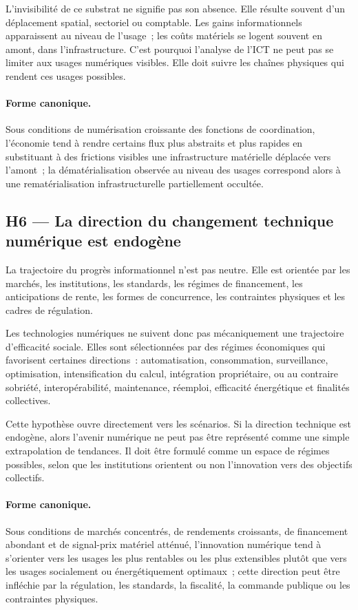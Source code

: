 L'invisibilité de ce substrat ne signifie pas son absence. Elle résulte souvent d'un déplacement spatial, sectoriel ou comptable. Les gains informationnels apparaissent au niveau de l'usage~; les coûts matériels se logent souvent en amont, dans l'infrastructure. C'est pourquoi l'analyse de l'ICT ne peut pas se limiter aux usages numériques visibles. Elle doit suivre les chaînes physiques qui rendent ces usages possibles.

\paragraph{Forme canonique.}
Sous conditions de numérisation croissante des fonctions de coordination, l'économie tend à rendre certains flux plus abstraits et plus rapides en substituant à des frictions visibles une infrastructure matérielle déplacée vers l'amont~; la dématérialisation observée au niveau des usages correspond alors à une rematérialisation infrastructurelle partiellement occultée.

\subsection{H6 --- La direction du changement technique numérique est endogène}

La trajectoire du progrès informationnel n'est pas neutre. Elle est orientée par les marchés, les institutions, les standards, les régimes de financement, les anticipations de rente, les formes de concurrence, les contraintes physiques et les cadres de régulation.

Les technologies numériques ne suivent donc pas mécaniquement une trajectoire d'efficacité sociale. Elles sont sélectionnées par des régimes économiques qui favorisent certaines directions~: automatisation, consommation, surveillance, optimisation, intensification du calcul, intégration propriétaire, ou au contraire sobriété, interopérabilité, maintenance, réemploi, efficacité énergétique et finalités collectives.

Cette hypothèse ouvre directement vers les scénarios. Si la direction technique est endogène, alors l'avenir numérique ne peut pas être représenté comme une simple extrapolation de tendances. Il doit être formulé comme un espace de régimes possibles, selon que les institutions orientent ou non l'innovation vers des objectifs collectifs.

\paragraph{Forme canonique.}
Sous conditions de marchés concentrés, de rendements croissants, de financement abondant et de signal-prix matériel atténué, l'innovation numérique tend à s'orienter vers les usages les plus rentables ou les plus extensibles plutôt que vers les usages socialement ou énergétiquement optimaux~; cette direction peut être infléchie par la régulation, les standards, la fiscalité, la commande publique ou les contraintes physiques.


